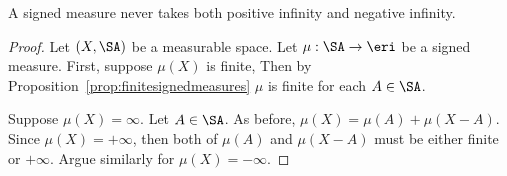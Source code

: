 \begin{prop}
A signed measure never takes
both positive infinity and
negative infinity.
\begin{proof}
Let $(X,\SA)$ be a measurable space.
Let $\mu: \SA \to \eri$ be a signed measure.
First, suppose $\mu(X)$ is finite,
Then by
Proposition~\ref{prop:finitesignedmeasures}
$\mu$ is finite for each $A \in \SA$.

Suppose $\mu(X) = \infty$.
Let $A \in \SA$.
As before,
$\mu(X) = \mu(A) + \mu(X - A)$.
Since $\mu(X) = +\infty$, then
both of $\mu(A)$ and $\mu(X-A)$
must be either finite or $+\infty$.
Argue similarly for $\mu(X) = -\infty$.
\end{proof}
\end{prop}

\strats
